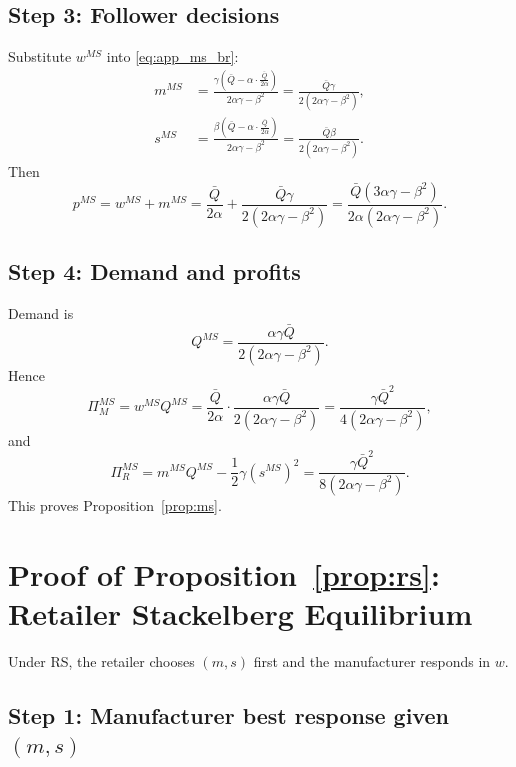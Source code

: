 \subsection{Step 3: Follower decisions}

Substitute $w^{MS}$ into \eqref{eq:app_ms_br}:
\begin{align}
 m^{MS}
 &=\frac{\gamma\left(\bar Q-\alpha\cdot\frac{\bar Q}{2\alpha}\right)}{2\alpha\gamma-\beta^2}
 =\frac{\bar Q\gamma}{2(2\alpha\gamma-\beta^2)},\\
 s^{MS}
 &=\frac{\beta\left(\bar Q-\alpha\cdot\frac{\bar Q}{2\alpha}\right)}{2\alpha\gamma-\beta^2}
 =\frac{\bar Q\beta}{2(2\alpha\gamma-\beta^2)}.
\end{align}
Then
\begin{equation}
 p^{MS}=w^{MS}+m^{MS}
 =\frac{\bar Q}{2\alpha}+\frac{\bar Q\gamma}{2(2\alpha\gamma-\beta^2)}
 =\frac{\bar Q(3\alpha\gamma-\beta^2)}{2\alpha(2\alpha\gamma-\beta^2)}.
\end{equation}

\subsection{Step 4: Demand and profits}

Demand is
\begin{equation}
 Q^{MS}=\frac{\alpha\gamma\bar Q}{2(2\alpha\gamma-\beta^2)}.
\end{equation}
Hence
\begin{equation}
 \Pi_M^{MS}=w^{MS}Q^{MS}
 =\frac{\bar Q}{2\alpha}\cdot \frac{\alpha\gamma\bar Q}{2(2\alpha\gamma-\beta^2)}
 =\frac{\gamma\bar Q^2}{4(2\alpha\gamma-\beta^2)},
\end{equation}
and
\begin{equation}
 \Pi_R^{MS}=m^{MS}Q^{MS}-\frac{1}{2}\gamma(s^{MS})^2
 =\frac{\gamma\bar Q^2}{8(2\alpha\gamma-\beta^2)}.
\end{equation}
This proves Proposition~\ref{prop:ms}.

\section{Proof of Proposition~\ref{prop:rs}: Retailer Stackelberg Equilibrium}
\label{app:proof_rs}

Under RS, the retailer chooses $(m,s)$ first and the manufacturer responds in
$w$.

\subsection{Step 1: Manufacturer best response given $(m,s)$}

